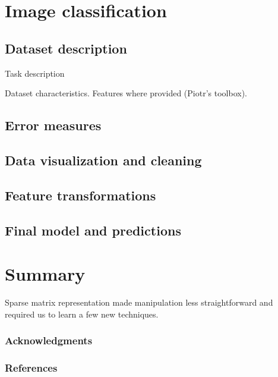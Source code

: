 \documentclass{article}
\begin{document}
\section{Image classification}

  \subsection{Dataset description}
  Task description

  Dataset characteristics. Features where provided (Piotr's toolbox).

  \subsection{Error measures}

  \subsection{Data visualization and cleaning}

  \subsection{Feature transformations}

  \subsection{Final model and predictions}



\section{Summary}
  Sparse matrix representation made manipulation less straightforward and required us to learn a few new techniques.

  \subsubsection*{Acknowledgments}

  \subsubsection*{References}
\end{document}
